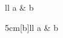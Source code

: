 \documentclass{article}
\begin{document}
\begin{supertabular}[t]{ll}
a & b \\
\end{supertabular}

\begin{supertabular*}{5cm}[b]{ll}
a & b \\
\end{supertabular*}
\end{document}
